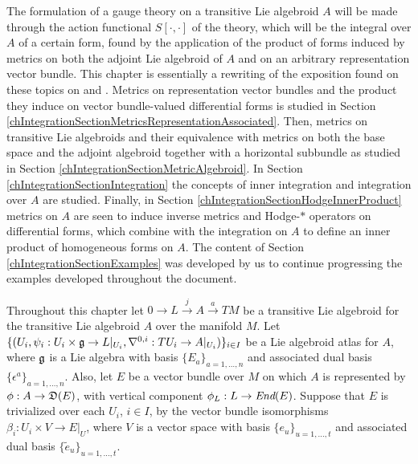The formulation of a gauge theory on a transitive Lie algebroid $A$ will be made through the action functional $S[\cdot, \cdot]$ of the theory, which will be the %
integral over $A$ of a certain form, found by the application of the product of forms induced by metrics on both the adjoint Lie algebroid of $A$ and on an arbitrary representation vector bundle.
This chapter is essentially a rewriting of the exposition found on these topics on \cite{Fournel2011} and \cite{Fournel2013}. Metrics on representation vector bundles and the product they induce on vector bundle-valued differential forms is studied in Section \ref{chIntegrationSectionMetricsRepresentationAssociated}. Then, metrics on transitive Lie algebroids and their equivalence with metrics on both the base space and the adjoint algebroid together with a horizontal subbundle as studied in Section \ref{chIntegrationSectionMetricAlgebroid}. In Section \ref{chIntegrationSectionIntegration} the concepts of inner integration and integration over $A$ are studied. Finally, in Section \ref{chIntegrationSectionHodgeInnerProduct} metrics on $A$ are seen to induce inverse metrics and Hodge-$*$ operators on differential forms, which combine with the integration on $A$ to define an inner product of homogeneous forms on $A$. The content of Section \ref{chIntegrationSectionExamples} was developed by us to continue progressing the examples developed throughout the document.

Throughout this chapter let $0 \to L \xrightarrow{j} A \xrightarrow{a} TM$ be a transitive Lie algebroid for the transitive Lie algebroid $A$ over the manifold $M$.
Let $\{(U_i, \psi_i: U_i \times \mathfrak{g} \to L|_{U_i}, \nabla^{0, i}: TU_i \to A|_{U_i})\}_{i \in I}$ be a Lie algebroid atlas for $A$, where $\mathfrak{g}$ is a Lie algebra with basis $\{E_a\}_{a = 1, \dots, n}$ and associated dual basis $\{\epsilon^a\}_{a = 1, \dots, n}$.
Also, let $E$ be a vector bundle over $M$ on which $A$ is represented by $\phi: A \to \alg D(E)$, with vertical component $\phi_L: L \to \End(E)$. Suppose that $E$ is trivialized over each $U_i$, $i \in I$, by the vector bundle isomorphisms $\beta_i: U_i \times V \to E|_U$, where $V$ is a vector space with basis $\{e_u\}_{u = 1, \dots, t}$ and associated dual basis $\{\tilde e_u\}_{u = 1, \dots, t}$.

